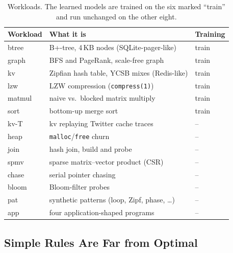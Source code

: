 \documentclass{article}
\begin{document}
\begin{table}[t]
\caption{Workloads. The learned models are trained on the six marked ``train'' and run
unchanged on the other eight.}
\label{tab:workloads}
\vskip 0.05in
\begin{center}
\begin{footnotesize}
\setlength{\tabcolsep}{3pt}
\begin{tabular}{@{}l>{\raggedright\arraybackslash}p{1.95in}l@{}}
\toprule
Workload & What it is & Training \\
\midrule
btree  & B+-tree, 4\,KB nodes (SQLite-pager-like)                & train \\
graph  & BFS and PageRank, scale-free graph                       & train \\
kv     & Zipfian hash table, YCSB mixes (Redis-like)              & train \\
lzw    & LZW compression (\texttt{compress(1)})                   & train \\
matmul & naive vs.\ blocked matrix multiply                       & train \\
sort   & bottom-up merge sort                                     & train \\
\midrule
kv-T   & kv replaying Twitter cache traces                        & -- \\
heap   & \texttt{malloc}/\texttt{free} churn                      & -- \\
join   & hash join, build and probe                               & -- \\
spmv   & sparse matrix--vector product (CSR)                      & -- \\
chase  & serial pointer chasing                                   & -- \\
bloom  & Bloom-filter probes                                      & -- \\
pat    & 11 synthetic patterns (loop, Zipf, phase, \ldots)        & -- \\
app    & four application-shaped programs                         & -- \\
\bottomrule
\end{tabular}
\end{footnotesize}
\end{center}
\end{table}

\subsection{Simple Rules Are Far from Optimal}
\label{sec:bg-headroom}
\end{document}
